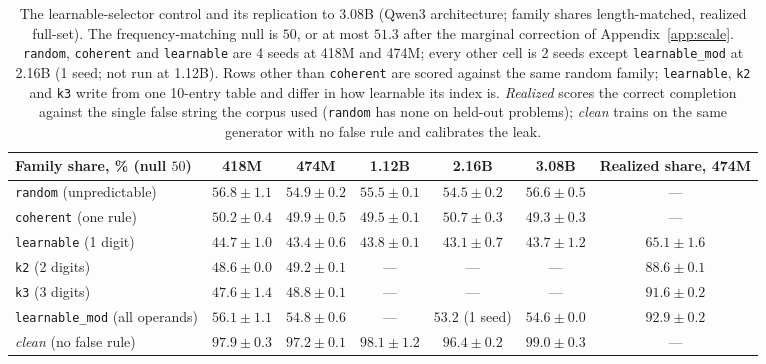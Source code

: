 \documentclass{article}
\begin{document}
\begin{table}[t]
\centering\footnotesize
\setlength{\tabcolsep}{2.5pt}
\begin{tabular}{lcccccc}
\toprule
Family share, \% (null $50$) & 418M & 474M & 1.12B & 2.16B & 3.08B & Realized share, 474M \\
\midrule
\texttt{random} (unpredictable)        & $56.8 \pm 1.1$ & $54.9 \pm 0.2$ & $55.5 \pm 0.1$ & $54.5 \pm 0.2$ & $56.6 \pm 0.5$ & --- \\
\texttt{coherent} (one rule)           & $50.2 \pm 0.4$ & $49.9 \pm 0.5$ & $49.5 \pm 0.1$ & $50.7 \pm 0.3$ & $49.3 \pm 0.3$ & --- \\
\texttt{learnable} (1 digit)           & $44.7 \pm 1.0$ & $\mathbf{43.4 \pm 0.6}$ & $43.8 \pm 0.1$ & $43.1 \pm 0.7$ & $43.7 \pm 1.2$ & $65.1 \pm 1.6$ \\
\texttt{k2} (2 digits)                 & $48.6 \pm 0.0$ & $49.2 \pm 0.1$ & --- & --- & --- & $88.6 \pm 0.1$ \\
\texttt{k3} (3 digits)                 & $47.6 \pm 1.4$ & $48.8 \pm 0.1$ & --- & --- & --- & $91.6 \pm 0.2$ \\
\texttt{learnable\_mod} (all operands) & $56.1 \pm 1.1$ & $54.8 \pm 0.6$ & --- & $53.2$ (1 seed) & $54.6 \pm 0.0$ & $92.9 \pm 0.2$ \\
\midrule
\emph{clean} (no false rule)           & $97.9 \pm 0.3$ & $97.2 \pm 0.1$ & $98.1 \pm 1.2$ & $96.4 \pm 0.2$ & $99.0 \pm 0.3$ & --- \\
\bottomrule
\end{tabular}
\caption{The learnable-selector control and its replication to 3.08B (Qwen3 architecture; family shares length-matched, realized full-set). The frequency-matching null is $50$, or at most $51.3$ after the marginal correction of Appendix~\ref{app:scale}. \texttt{random}, \texttt{coherent} and \texttt{learnable} are 4 seeds at 418M and 474M; every other cell is 2 seeds except \texttt{learnable\_mod} at 2.16B (1 seed; not run at 1.12B). Rows other than \texttt{coherent} are scored against the same random family; \texttt{learnable}, \texttt{k2} and \texttt{k3} write from one 10-entry table and differ in how learnable its index is. \emph{Realized} scores the correct completion against the single false string the corpus used (\texttt{random} has none on held-out problems); \emph{clean} trains on the same generator with no false rule and calibrates the leak.}
\label{tab:learnable}
\end{table}
\end{document}
